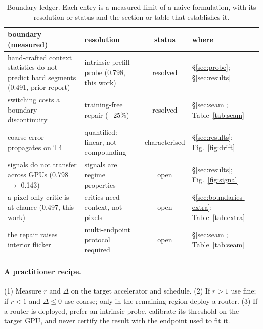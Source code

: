 \documentclass[review]{cas-sc}          %
\begin{document}
\begin{table}
  \centering
  \caption{Boundary ledger. Each entry is a measured limit of a naive formulation, with its resolution or
  status and the section or table that establishes it.}
  \label{tab:boundary}
  \footnotesize
  \setlength{\tabcolsep}{3pt}
  \begin{tabular}{p{}p{}c p{}}
    \toprule
    boundary (measured) & resolution & status & where \\
    \midrule
    hand-crafted context statistics do not predict hard segments (0.491, prior report) & intrinsic prefill probe (0.798, this work) & resolved & \S\ref{sec:probe}; \S\ref{sec:results} \\
    switching costs a boundary discontinuity & training-free repair ($-25\%$) & resolved & \S\ref{sec:seam}; Table~\ref{tab:seam} \\
    coarse error propagates on T4 & quantified: linear, not compounding & characterised & \S\ref{sec:results}; Fig.~\ref{fig:drift} \\
    signals do not transfer across GPUs (0.798 $\rightarrow$ 0.143) & signals are regime properties & open & \S\ref{sec:results}; Fig.~\ref{fig:signal} \\
    a pixel-only critic is at chance (0.497, this work) & critics need context, not pixels & open & \S\ref{sec:boundaries-extra}; Table~\ref{tab:extra} \\
    the repair raises interior flicker & multi-endpoint protocol required & open & \S\ref{sec:seam}; Table~\ref{tab:seam} \\
    \bottomrule
  \end{tabular}
\end{table}

\paragraph{A practitioner recipe.}
(1) Measure $r$ and $\Delta$ on the target accelerator and schedule. (2) If $r>1$ use fine; if $r<1$ and
$\Delta\le 0$ use coarse; only in the remaining region deploy a router. (3) If a router is deployed,
prefer an intrinsic probe, calibrate its threshold on the target GPU, and never certify the result with
the endpoint used to fit it.
\end{document}
